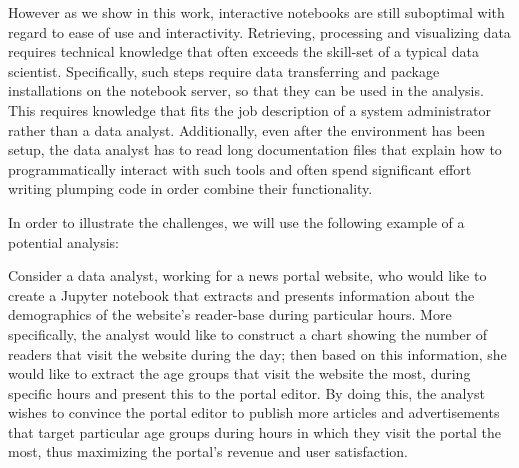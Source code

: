 However as we show in this work, interactive notebooks are still suboptimal with regard to ease of use and interactivity. Retrieving, processing and visualizing data requires technical knowledge that often exceeds the skill-set of a typical data scientist. Specifically, such steps require data transferring and package installations on the notebook server, so that they can be used in the analysis. This requires knowledge that fits the job description of a system administrator rather than a data analyst. Additionally, even after the environment has been setup, the data analyst has to read long documentation files that explain how to programmatically interact with such tools and often spend significant effort writing plumping code in order combine their functionality.


In order to illustrate the challenges, we will use the following example of a potential analysis:

\begin{example}
Consider a data analyst, working for a news portal website, who would like to create a Jupyter notebook that extracts and presents information about the demographics of the website's reader-base during particular hours. More specifically, the analyst would like to construct a chart showing the number of readers that visit the website during the day; then based on this information, she would like to extract the age groups that visit the website the most, during specific hours and present this to the portal editor. By doing this, the analyst wishes to convince the portal editor to publish more articles and advertisements that target particular age groups during hours in which they visit the portal the most, thus maximizing the portal's revenue and user satisfaction.
\end{example}


